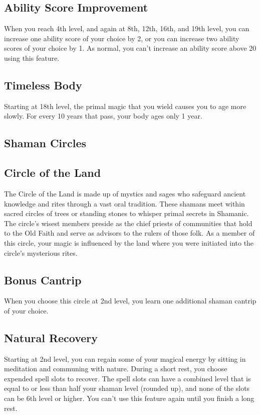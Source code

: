 \subsection{Ability Score Improvement}

When you reach 4th level, and again at 8th, 12th, 16th, and 19th level, you can increase one ability score of your choice by 2, or you can increase two ability scores of your choice by 1. As normal, you can't increase an ability score above 20 using this feature.

\subsection{Timeless Body}

Starting at 18th level, the primal magic that you wield causes you to age more slowly. For every 10 years that pass, your body ages only 1 year.

\subsection{Shaman Circles}

\subsection{Circle of the Land}

The Circle of the Land is made up of mystics and sages who safeguard ancient knowledge and rites through a vast oral tradition. These shamans meet within sacred circles of trees or standing stones to whisper primal secrets in Shamanic. The circle's wisest members preside as the chief priests of communities that hold to the Old Faith and serve as advisors to the rulers of those folk. As a member of this circle, your magic is influenced by the land where you were initiated into the circle's mysterious rites.

\subsection{Bonus Cantrip}

When you choose this circle at 2nd level, you learn one additional shaman cantrip of your choice.

\subsection{Natural Recovery}

Starting at 2nd level, you can regain some of your magical energy by sitting in meditation and communing with nature. During a short rest, you choose expended spell slots to recover. The spell slots can have a combined level that is equal to or less than half your shaman level
(rounded up), and none of the slots can be 6th level or higher. You can't use this feature again until you finish a long rest.

